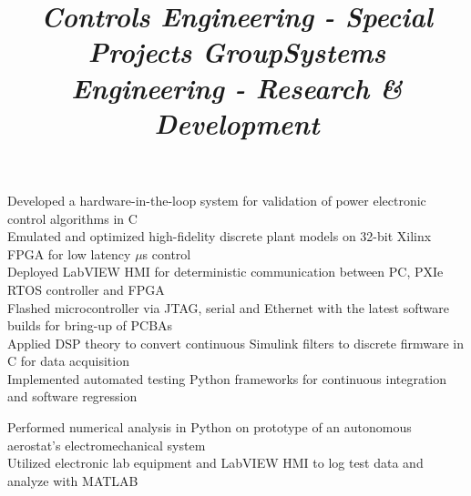 \documentclass[mm]{res}
\begin{document}
\begin{resume}
\title{\textsl{Controls Engineering - Special Projects Group}}
\begin{position}
\tb Developed a hardware-in-the-loop system for validation of power electronic control algorithms in C\\
\tb Emulated and optimized high-fidelity discrete plant models on 32-bit Xilinx FPGA for low latency $\mu$s control \\
\tb Deployed LabVIEW HMI for deterministic communication between PC, PXIe RTOS controller and FPGA \\
\tb Flashed microcontroller via JTAG, serial and Ethernet with the latest software builds for bring-up of PCBAs \\
\tb Applied DSP theory to convert continuous Simulink filters to discrete firmware in C for data acquisition \\
\tb Implemented automated testing Python frameworks for continuous integration and software regression
\end{position}

\title{\textsl{Systems Engineering - Research \& Development}}
\begin{position}
\tb Performed numerical analysis in Python on prototype of an autonomous aerostat's electromechanical system \\
\tb Utilized electronic lab equipment and LabVIEW HMI to log test data and analyze with MATLAB
\end{position}


\end{resume}
\end{document}

